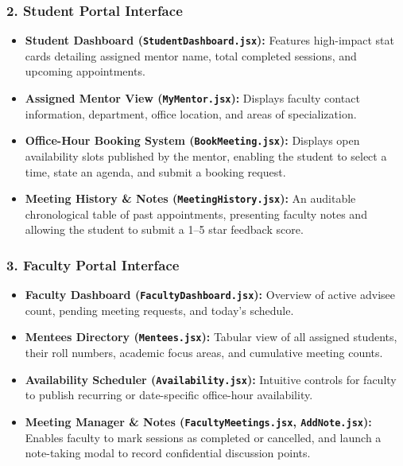 \documentclass[11pt,a4paper]{article}
\begin{document}
\subsubsection{2. Student Portal Interface}
\begin{itemize}[leftmargin=1.4em, itemsep=0.2em]
  \item \textbf{Student Dashboard (\texttt{StudentDashboard.jsx}):} Features high-impact stat cards detailing assigned mentor name, total completed sessions, and upcoming appointments.
  \item \textbf{Assigned Mentor View (\texttt{MyMentor.jsx}):} Displays faculty contact information, department, office location, and areas of specialization.
  \item \textbf{Office-Hour Booking System (\texttt{BookMeeting.jsx}):} Displays open availability slots published by the mentor, enabling the student to select a time, state an agenda, and submit a booking request.
  \item \textbf{Meeting History \& Notes (\texttt{MeetingHistory.jsx}):} An auditable chronological table of past appointments, presenting faculty notes and allowing the student to submit a 1--5 star feedback score.
\end{itemize}

\subsubsection{3. Faculty Portal Interface}
\begin{itemize}[leftmargin=1.4em, itemsep=0.2em]
  \item \textbf{Faculty Dashboard (\texttt{FacultyDashboard.jsx}):} Overview of active advisee count, pending meeting requests, and today's schedule.
  \item \textbf{Mentees Directory (\texttt{Mentees.jsx}):} Tabular view of all assigned students, their roll numbers, academic focus areas, and cumulative meeting counts.
  \item \textbf{Availability Scheduler (\texttt{Availability.jsx}):} Intuitive controls for faculty to publish recurring or date-specific office-hour availability.
  \item \textbf{Meeting Manager \& Notes (\texttt{FacultyMeetings.jsx}, \texttt{AddNote.jsx}):} Enables faculty to mark sessions as completed or cancelled, and launch a note-taking modal to record confidential discussion points.
\end{itemize}
\end{document}
